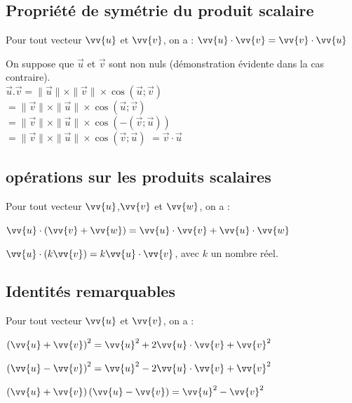     \subsection{Propriété de symétrie du produit scalaire}
    
    \begin{propriete}
        Pour tout vecteur $\vv{u}$ et $\vv{v}$, on a : $\vv{u}\cdot \vv{v}= \vv{v}\cdot \vv{u}$ 
    \end{propriete}
    
    \begin{demonstration}
        On suppose que $\vec{u}$ et $\vec{v}$ sont non nuls (démonstration évidente dans la cas contraire).\\
        $\vec{u} . \vec{v}=\|\vec{u}\| \times\|\vec{v}\| \times \cos (\vec{u} ; \vec{v})$\\
        $=\|\vec{v}\| \times\|\vec{u}\| \times \cos (\vec{u} ; \vec{v})$\\
        $=\|\vec{v}\| \times\|\vec{u}\| \times \cos (-(\vec{v} ; \vec{u}))$\\
        $=\|\vec{v}\| \times\|\vec{u}\| \times \cos (\vec{v} ; \vec{u})$
        $=\vec{v} \cdot \vec{u}$\\
    \end{demonstration}
    
    \subsection{opérations sur les produits scalaires}
    
    \begin{propriete}
        Pour tout vecteur $\vv{u}$,$\vv{v}$ et $\vv{w}$, on a :
        \begin{enumDef}
            \item $\vv{u} \cdot (\vv{v}+\vv{w})=\vv{u} \cdot \vv{v}+\vv{u} \cdot \vv{w}$
            \item $\vv{u} \cdot (k \vv{v})=k \vv{u} \cdot \vv{v}$, avec $k$ un nombre réel.
        \end{enumDef}
    \end{propriete}

    \subsection{Identités remarquables}
    
    \begin{propriete}
        Pour tout vecteur $\vv{u}$ et $\vv{v}$, on a :
        \begin{enumDef}
            \item $\left(\vv{u}+\vv{v}\right)^2=\vv{u}^2 +2\vv{u} \cdot \vv{v}+\vv{v}^2$
            \item $\left(\vv{u}-\vv{v}\right)^2=\vv{u}^2 -2\vv{u} \cdot \vv{v}+\vv{v}^2$
            \item $\left(\vv{u}+\vv{v}\right)\left(\vv{u}-\vv{v}\right)=\vv{u}^2-\vv{v}^2$
        \end{enumDef}
    \end{propriete}
    
